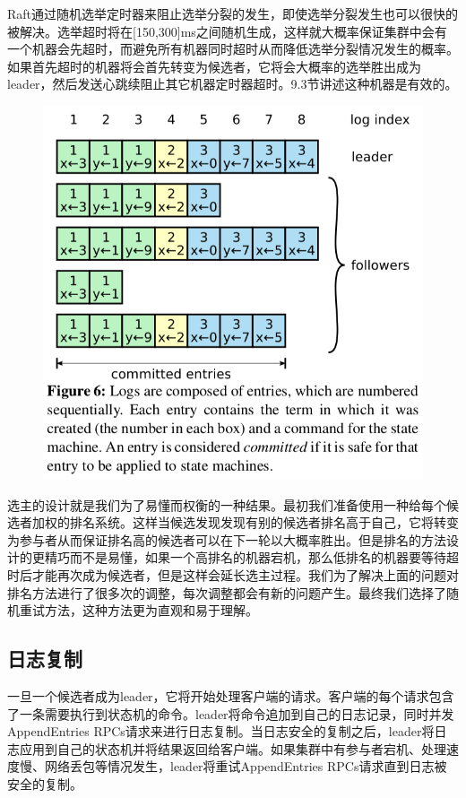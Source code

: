 \documentclass[journal]{IEEEtran}
\begin{document}
Raft通过随机选举定时器来阻止选举分裂的发生，即使选举分裂发生也可以很快的被解决。选举超时将在[150,300]ms之间随机生成，这样就大概率保证集群中会有一个机器会先超时，而避免所有机器同时超时从而降低选举分裂情况发生的概率。如果首先超时的机器将会首先转变为候选者，它将会大概率的选举胜出成为leader，然后发送心跳续阻止其它机器定时器超时。9.3节讲述这种机器是有效的。
\begin{figure}[htbp]
\begin{center}
\includegraphics[width=1\linewidth]{./fig6.png}
\end{center}
\end{figure}


选主的设计就是我们为了易懂而权衡的一种结果。最初我们准备使用一种给每个候选者加权的排名系统。这样当候选发现发现有别的候选者排名高于自己，它将转变为参与者从而保证排名高的候选者可以在下一轮以大概率胜出。但是排名的方法设计的更精巧而不是易懂，如果一个高排名的机器宕机，那么低排名的机器要等待超时后才能再次成为候选者，但是这样会延长选主过程。我们为了解决上面的问题对排名方法进行了很多次的调整，每次调整都会有新的问题产生。最终我们选择了随机重试方法，这种方法更为直观和易于理解。

\subsection{日志复制}
一旦一个候选者成为leader，它将开始处理客户端的请求。客户端的每个请求包含了一条需要执行到状态机的命令。leader将命令追加到自己的日志记录，同时并发AppendEntries RPCs请求来进行日志复制。当日志安全的复制之后，leader将日志应用到自己的状态机并将结果返回给客户端。如果集群中有参与者宕机、处理速度慢、网络丢包等情况发生，leader将重试AppendEntries RPCs请求直到日志被安全的复制。
\end{document}
